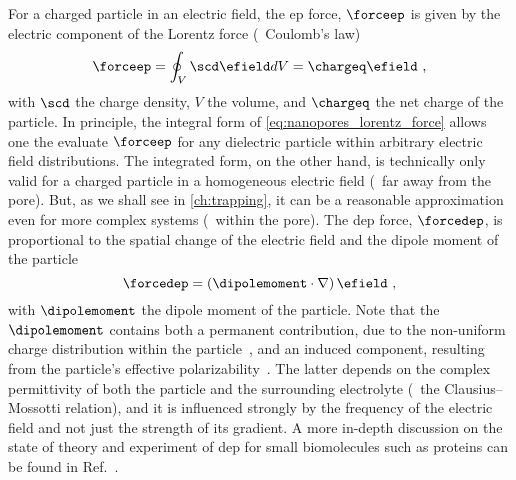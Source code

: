 For a charged particle in an electric field, the \gls{ep} force, $\forceep$ is given by the electric component
of the Lorentz force (\ie~Coulomb's law)~\cite{Lu-2012}
%
\begin{equation}\label{eq:nanopores_lorentz_force}
  \forceep = \oint_{V} \scd \efield dV = \chargeq \efield
  \text{ ,}
\end{equation}
%
with $\scd$ the charge density, $V$ the volume, and $\chargeq$ the net charge of the particle. In principle,
the integral form of \cref{eq:nanopores_lorentz_force} allows one the evaluate $\forceep$ for any dielectric
particle within arbitrary electric field distributions. The integrated form, on the other hand, is technically
only valid for a charged particle in a homogeneous electric field (\ie~far away from the pore). But, as we
shall see in \cref{ch:trapping}, it can be a reasonable approximation even for more complex systems
(\eg~within the pore). The \gls{dep} force, $\forcedep$, is proportional to the spatial change of the electric
field and the dipole moment of the particle~\cite{Hoelzel-2020}
%
\begin{equation}\label{eq:nanopores_dep_force}
  \forcedep = \left( \dipolemoment \cdot \nabla \right) \efield
  \text{ ,}
\end{equation}
%
with $\dipolemoment$ the dipole moment of the particle. Note that the $\dipolemoment$ contains both a
permanent contribution, due to the non-uniform charge distribution within the
particle~\cite{Hoelzel-2020,VanMeervelt-2017}, and an induced component, resulting from the particle's
effective polarizability~\cite{Minerick-2015}. The latter depends on the complex permittivity of both the particle
and the surrounding electrolyte (\ie~the Clausius--Mossotti relation), and it is influenced strongly by the
frequency of the electric field and not just the strength of its gradient. A more in-depth discussion on the state
of theory and experiment of \gls{dep} for small biomolecules such as proteins can be found in
Ref.~\cite{Hoelzel-2020}.

